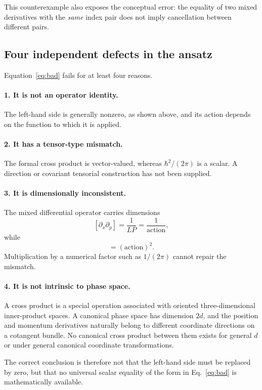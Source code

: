 This counterexample also exposes the conceptual error: the equality of two mixed derivatives with the \emph{same} index pair does not imply cancellation between different pairs.

\subsection{Four independent defects in the ansatz}

Equation~\eqref{eq:bad} fails for at least four reasons.

\paragraph{1. It is not an operator identity.}
The left-hand side is generally nonzero, as shown above, and its action depends on the function to which it is applied.

\paragraph{2. It has a tensor-type mismatch.}
The formal cross product is vector-valued, whereas \(\hbar^2/(2\pi)\) is a scalar. A direction or covariant tensorial construction has not been supplied.

\paragraph{3. It is dimensionally inconsistent.}
The mixed differential operator carries dimensions
\begin{equation}
\left[\partial_x\partial_p\right]
=
\frac{1}{LP}
=
\frac{1}{\text{action}},
\end{equation}
while
\begin{equation}
[\hbar^2]=(\text{action})^2.
\end{equation}
Multiplication by a numerical factor such as \(1/(2\pi)\) cannot repair the mismatch.

\paragraph{4. It is not intrinsic to phase space.}
A cross product is a special operation associated with oriented three-dimensional inner-product spaces. A canonical phase space has dimension \(2d\), and the position and momentum derivatives naturally belong to different coordinate directions on a cotangent bundle. No canonical cross product between them exists for general \(d\) or under general canonical coordinate transformations.

The correct conclusion is therefore not that the left-hand side must be replaced by zero, but that no universal scalar equality of the form in Eq.~\eqref{eq:bad} is mathematically available.
